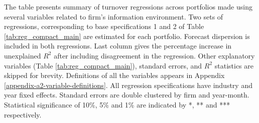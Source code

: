 \begin{table}
\begin{threeparttable}
\begin{tabular}[t]{>{\raggedright\arraybackslash}p{5.5cm}>{\raggedright\arraybackslash}p{1.8cm}>{\raggedright\arraybackslash}p{1.8cm}>{\raggedright\arraybackslash}p{1.8cm}>{\raggedright\arraybackslash}p{1.8cm}}
\bottomrule
\end{tabular}
\begin{tablenotes}
\item The table presents summary of turnover regressions across portfolios made using several variables related to firm's information environment. Two sets of regressions, corresponding to base specifications 1 and 2 of Table \ref{tab:reg_compact_main} are estimated for each portfolio. Forecast dispersion is included in both regressions. Last column gives the percentage increase in unexplained $R^2$ after including disagreement in the regression. Other explanatory variables (Table \ref{tab:reg_compact_main}), standard errors, and $R^2$ statistics are skipped for brevity. Definitions of all the variables appears in Appendix \ref{appendix-a2-variable-definitions}. All regression specifications have industry and year fixed effects. Standard errors are double clustered by firm and year-month. Statistical significance of 10\%, 5\% and 1\% are indicated by *, ** and *** respectively.
\end{tablenotes}
\end{threeparttable}
\end{table}